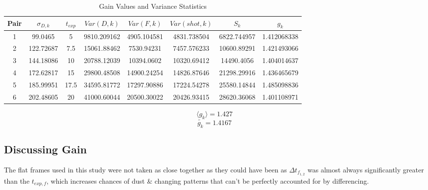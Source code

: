 \documentclass[12pt, letterpaper]{article}
\begin{document}
\begin{table} [H]
    \centering
    
    \begin{tabular}{
        S[table-format=1.0, round-mode=places, round-precision=0]
        S[table-format=3.3, round-mode=places, round-precision=3] 
        S[table-format=2.1, round-mode=places, round-precision=1] 
        S[table-format=5.2, round-mode=places, round-precision=2] 
        S[table-format=5.2, round-mode=places, round-precision=2] 
        S[table-format=5.2, round-mode=places, round-precision=2] 
        S[table-format=5.2, round-mode=places, round-precision=2] 
        S[table-format=1.4, round-mode=places, round-precision=4] 
    }
        \toprule
        {Pair}&{$\sigma_{D,k}$} & {$t_{exp}$} & {$Var({D, k})$} & {$Var({F, k})$} & {$Var(shot, k)$} & {$S_k$} & {$g_k$} \\
         & 99.0465   & 5    & 9810.209162 & 4905.104581 & 4831.738504 & 6822.744957  & 1.412068338\\
        2 & 122.72687 & 7.5  & 15061.88462 & 7530.94231  & 7457.576233 & 10600.89291 & 1.421493066 \\
        3 & 144.18086 & 10   & 20788.12039 & 10394.0602  & 10320.69412 & 14490.4056 & 1.404014637 \\
        4 & 172.62817 & 15   & 29800.48508 & 14900.24254 & 14826.87646 & 21298.29916 & 1.436465679 \\
        5 & 185.99951 & 17.5 & 34595.81772 & 17297.90886 & 17224.54278 & 25580.14844 & 1.485098836 \\
        6 & 202.48605 & 20   & 41000.60044 & 20500.30022 & 20426.93415 & 28620.36068 & 1.401108971 \\
        \bottomrule
    \end{tabular}
    \caption{Gain Values and Variance Statistics}
    \label{tab:GainValues}
\end{table}

$$ \langle g_k \rangle = 1.427$$ $$\tilde{g_k} = 1.4167$$ 
\begin{center}
\end{center}

\subsection{Discussing Gain}
The flat frames used in this study were not taken as close together as they could have been as $\Delta t_{f_{1, 2}}$ was almost always significantly greater than the $t_{exp, f}$, which increases chances of dust \& changing patterns that can't be perfectly accounted for by differencing. 
\end{document}
